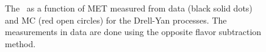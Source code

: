 \begin{figure}[!hbtp]
\centering
{}
\caption{
 The \routin\, as a function of MET measured from data (black solid dots) 
and MC (red open circles) for the Drell-Yan processes. The measurements 
in data are done using the opposite flavor subtraction method. }
\label{fig:dyr_ww}
\end{figure}

